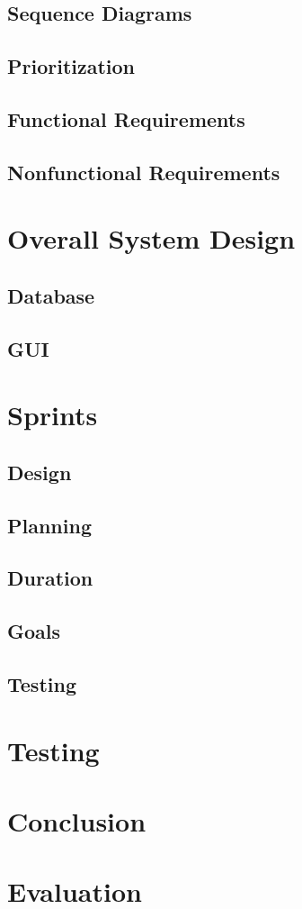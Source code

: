 \documentclass[10pt,a4paper,oneside]{report}
\begin{document}
\section{Sequence Diagrams}
\section{Prioritization}
\section{Functional Requirements}
\section{Nonfunctional Requirements}



\chapter{Overall System Design}
\section{Database}
\section{GUI}

\chapter{Sprints}
\section{Design}
\section{Planning}
\section{Duration}
\section{Goals}
\section{Testing}

\chapter{Testing}

\chapter{Conclusion}

\chapter{Evaluation}
\end{document}
